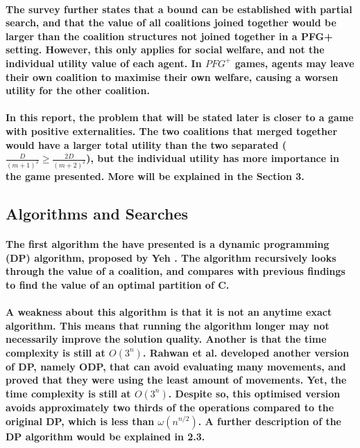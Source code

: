 \documentclass[11pt]{report}
\begin{document}
\paragraph{The survey further states that a bound can be established with partial search, and that the value of all coalitions joined together would be larger than the coalition structures not joined together in a PFG+ setting. However, this only applies for social welfare, and not the individual utility value of each agent. In $PFG^+$ games, agents may leave their own coalition to maximise their own welfare, causing a worsen utility for the other coalition.}

\paragraph{In this report, the problem that will be stated later is closer to a game with positive externalities. The two coalitions that merged together would have a larger total utility than the two separated ($\frac{D}{(m+1)^2} \geq \frac{2D}{(m+2)^2}$), but the individual utility has more importance in the game presented. More will be explained in the Section 3.  }

\subsection{Algorithms and Searches}

\paragraph{The first algorithm the have presented is a dynamic programming (DP) algorithm, proposed by Yeh \cite{yeh1986dynamic}. The algorithm recursively looks through the value of a coalition, and compares with previous findings to find the value of an optimal partition of C. }
\paragraph{A weakness about this algorithm is that it is not an anytime exact algorithm. This means that running the algorithm longer may not necessarily improve the solution quality. Another is that the time complexity is still at $O(3^n)$. Rahwan et al. \cite{michalak2016hybrid} developed another version of DP, namely ODP, that can avoid evaluating many movements, and proved that they were using the least amount of movements. Yet, the time complexity is still at $O(3^n)$. Despite so, this optimised version avoids approximately two thirds of the operations compared to the original DP, which is less than $\omega (n^{n/2})$. A further description of the DP algorithm would be explained in 2.3. }
\end{document}
